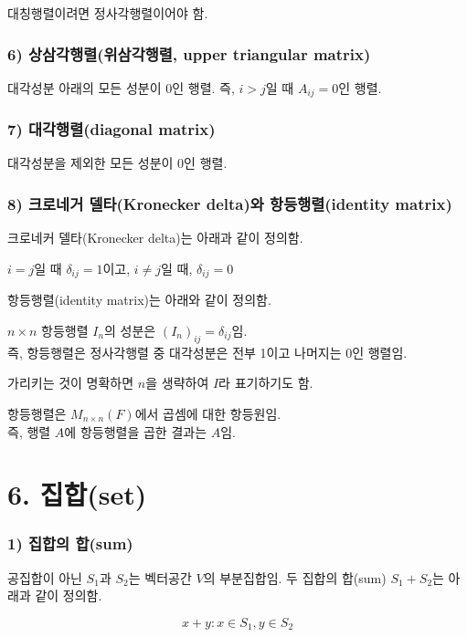 대칭행렬이려면 정사각행렬이어야 함.

\subsubsection*{6) 상삼각행렬(위삼각행렬, upper triangular matrix)\\}
\begin{DEF}
대각성분 아래의 모든 성분이 0인 행렬. 즉, $i>j$일 때 $A_{ij}=0$인 행렬.
\end{DEF}

\subsubsection*{7) 대각행렬(diagonal matrix)\\}
\begin{DEF}
대각성분을 제외한 모든 성분이 0인 행렬.
\end{DEF}


\newpage


\subsubsection*{8) 크로네거 델타(Kronecker delta)와 항등행렬(identity matrix)}
크로네커 델타(Kronecker delta)는 아래과 같이 정의함.\\

\begin{DEF}
$i=j$일 때 $\delta_{ij}=1$이고, $i \neq j$일 때, $\delta_{ij}=0$
\end{DEF}

항등행렬(identity matrix)는 아래와 같이 정의함.\\

\begin{DEF}
$n \times n$ 항등행렬 $I_n$의 성분은 $(I_n)_{ij}=\delta_{ij}$임.\\
즉, 항등행렬은 정사각행렬 중 대각성분은 전부 1이고 나머지는 0인 행렬임.
\end{DEF}

가리키는 것이 명확하면 $n$을 생략하여 $I$라 표기하기도 함.

항등행렬은 $M_{n \times n}(F)$에서 곱셈에 대한 항등원임.\\
즉, 행렬 $A$에 항등행렬을 곱한 결과는 $A$임.\\


\section*{6. 집합(set)}
\subsubsection*{1) 집합의 합(sum)\\}
\begin{DEF}
공집합이 아닌 $S_1$과 $S_2$는 벡터공간 $V$의 부분집합임. 두 집합의 합(sum) $S_1 + S_2$는 아래과 같이 정의함.

\[
{x+y:x \in S_1,y \in S_2}
\]
\end{DEF}

